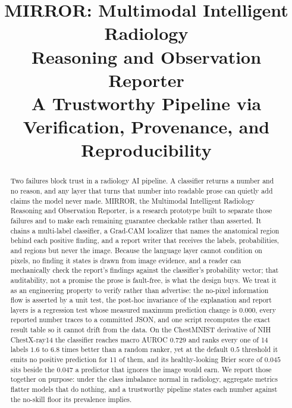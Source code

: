 \documentclass[conference]{IEEEtran}
\begin{document}
\title{MIRROR: Multimodal Intelligent Radiology\\
Reasoning and Observation Reporter\\[4pt]
{\large A Trustworthy Pipeline via Verification, Provenance, and Reproducibility}}

\author{%
}

\maketitle

\begin{abstract}
Two failures block trust in a radiology AI pipeline. A classifier returns a
number and no reason, and any layer that turns that number into readable prose can
quietly add claims the model never made. MIRROR, the Multimodal Intelligent Radiology Reasoning
and Observation Reporter, is a research prototype built to separate those failures
and to make each remaining guarantee checkable rather than
asserted. It chains a multi-label classifier, a Grad-CAM localizer that names the
anatomical region behind each positive finding, and a report writer that receives
the labels, probabilities, and regions but never the image. Because the language
layer cannot condition on pixels, no finding it states is drawn from image evidence,
and a reader can mechanically check the report's findings against the classifier's
probability vector; that auditability, not a promise the prose is fault-free, is what
the design buys. We treat it as an engineering property to verify rather than
advertise: the no-pixel information flow is asserted by a unit test, the post-hoc
invariance of the explanation and report layers is a regression test whose measured
maximum prediction change is $0.000$, every reported number traces to a committed
JSON, and one script recomputes the exact result table so it cannot drift from the
data. On
the ChestMNIST derivative of NIH ChestX-ray14 the classifier reaches macro AUROC
$0.729$ and ranks every one of 14 labels $1.6$ to $6.8$ times better than a random
ranker, yet at the default $0.5$ threshold it emits no positive prediction for 11
of them, and its healthy-looking Brier score of $0.045$ sits beside the $0.047$ a
predictor that ignores the image would earn. We report those together on purpose:
under the class imbalance normal in radiology, aggregate metrics flatter models
that do nothing, and a trustworthy pipeline states each number against the no-skill
floor its prevalence implies.
\end{abstract}
\end{document}

